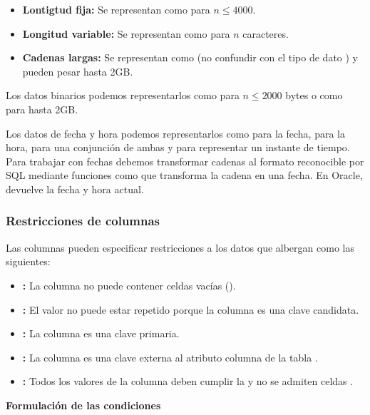 \begin{itemize}
	\item\textbf{Lontigtud fija:} Se representan como  para $n\leq4000$.
	\item\textbf{Longitud variable:} Se representan como  para $n$ caracteres.
	\item\textbf{Cadenas largas:} Se representan como  (no confundir con el tipo de dato ) y pueden pesar hasta 2GB\@.
\end{itemize}

Los datos binarios podemos representarlos como  para $n\leq2000$ bytes o como  para hasta 2GB\@.

Los datos de fecha y hora podemos representarlos como  para la fecha,  para la hora,  para una conjunción de ambas y  para representar un instante de tiempo.
Para trabajar con fechas debemos transformar cadenas al formato reconocible por SQL mediante funciones como  que transforma la cadena  en una fecha.
En Oracle,  devuelve la fecha y hora actual.

\subsubsection{Restricciones de columnas}

Las columnas pueden especificar restricciones a los datos que albergan como las siguientes:

\begin{itemize}
	\item{}\textbf{:} La columna no puede contener celdas vacías ().
	\item{}\textbf{:} El valor no puede estar repetido porque la columna es una clave candidata.
	\item{}\textbf{:} La columna es una clave primaria.
	\item{}\textbf{:} La columna es una clave externa al atributo columna de la tabla .
	\item{}\textbf{:} Todos los valores de la columna deben cumplir la  y no se admiten celdas .
\end{itemize}

\textbf{Formulación de las condiciones}

